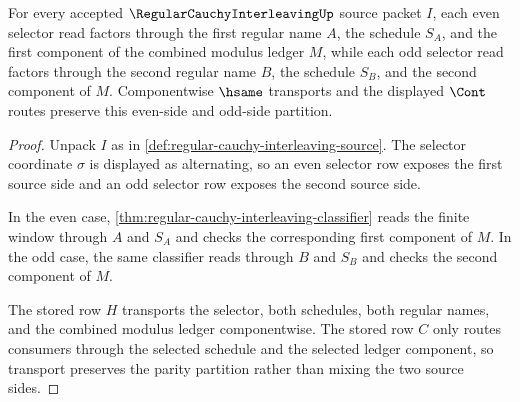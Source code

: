 \begin{theorem}
\label{thm:regular-cauchy-interleaving-selector-parity-exactness}
For every accepted $\RegularCauchyInterleavingUp$ source packet $I$, each even selector read factors through the first regular name $A$, the schedule $S_A$, and the first component of the combined modulus ledger $M$, while each odd selector read factors through the second regular name $B$, the schedule $S_B$, and the second component of $M$. Componentwise $\hsame$ transports and the displayed $\Cont$ routes preserve this even-side and odd-side partition.
\end{theorem}
\begin{proof}
Unpack $I$ as in \autoref{def:regular-cauchy-interleaving-source}. The selector coordinate $\sigma$ is displayed as alternating, so an even selector row exposes the first source side and an odd selector row exposes the second source side.

In the even case, \autoref{thm:regular-cauchy-interleaving-classifier} reads the finite window through $A$ and $S_A$ and checks the corresponding first component of $M$. In the odd case, the same classifier reads through $B$ and $S_B$ and checks the second component of $M$.

The stored row $H$ transports the selector, both schedules, both regular names, and the combined modulus ledger componentwise. The stored row $C$ only routes consumers through the selected schedule and the selected ledger component, so transport preserves the parity partition rather than mixing the two source sides.
\end{proof}

